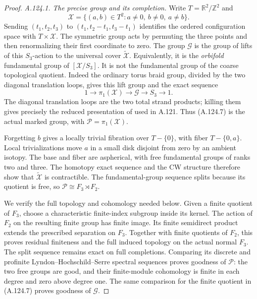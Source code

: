 \begin{proof}
\emph{A.124.1. The precise group and its completion.}
Write \(T=\mathbb R^2/\mathbb Z^2\) and
\[
 \mathcal X=\{(a,b)\in T^2:a\ne0,\ b\ne0,\ a\ne b\}.
 \tag{A.124.6}
\]
Sending \((t_1,t_2,t_3)\) to
\((t_1,t_2-t_1,t_3-t_1)\) identifies the ordered configuration
space with \(T\times\mathcal X\).
The symmetric group acts by permuting the three points and then
renormalizing their first coordinate to zero.
The group \(\mathcal G\) is the group of lifts of this \(S_3\)-action
to the universal cover \(\widetilde{\mathcal X}\).
Equivalently, it is the \emph{orbifold} fundamental group of
\([\mathcal X/S_3]\). It is not the fundamental group of the coarse
topological quotient. Indeed the ordinary torus braid group, divided
by the two diagonal translation loops, gives this lift group and the
exact sequence
\[
       1\longrightarrow\pi_1(\mathcal X)
        \longrightarrow\mathcal G\longrightarrow S_3
        \longrightarrow1.
 \tag{A.124.7}
\]
The diagonal translation loops are the two total strand products;
killing them gives precisely the reduced presentation of
\cite[Section~1.2, equation~(7)]{A_Enriquez2014} used in A.121.
Thus (A.124.7) is the actual marked group, with
\(\mathcal P=\pi_1(\mathcal X)\).

Forgetting \(b\) gives a locally trivial fibration over \(T-\{0\}\),
with fiber \(T-\{0,a\}\). Local trivializations move \(a\) in a small
disk disjoint from zero by an ambient isotopy. The base and fiber
are aspherical, with free fundamental groups of ranks two and three.
The homotopy exact sequence and the CW structure therefore show that
\(\widetilde{\mathcal X}\) is contractible. The fundamental-group
sequence splits because its quotient is free, so
\(\mathcal P\cong F_3\rtimes F_2\).

We verify the full topology and cohomology needed below.
Given a finite quotient of \(F_3\), choose a characteristic finite-index
subgroup inside its kernel. The action of \(F_2\) on the resulting
finite group has finite image. Its finite semidirect product extends
the prescribed separation on \(F_3\). Together with finite quotients
of \(F_2\), this proves residual finiteness and the full induced
topology on the actual normal \(F_3\). The split sequence remains
exact on full completions. Comparing its discrete and profinite
Lyndon--Hochschild--Serre spectral sequences proves goodness of
\(\mathcal P\): the two free groups are good, and their finite-module
cohomology is finite in each degree and zero above degree one.
The same comparison for the finite quotient in (A.124.7) proves
goodness of \(\mathcal G\).


\end{proof}
